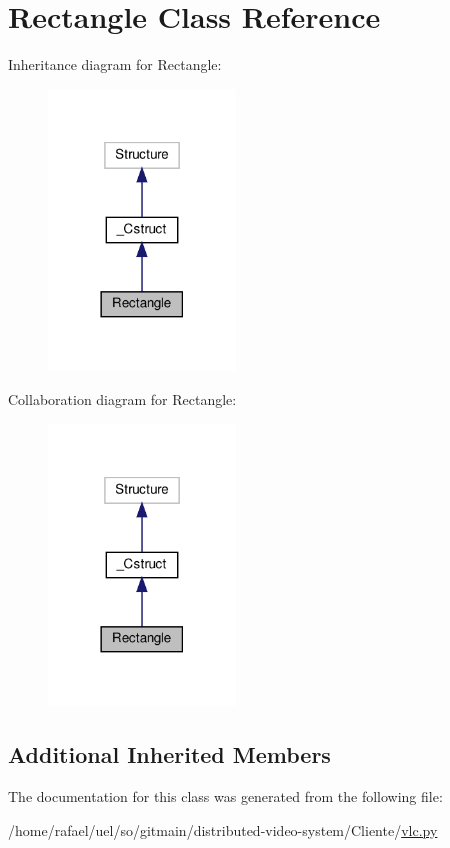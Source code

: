 \hypertarget{classvlc_1_1_rectangle}{}\section{Rectangle Class Reference}
\label{classvlc_1_1_rectangle}


Inheritance diagram for Rectangle\+:
\nopagebreak
\begin{figure}[H]
\begin{center}
\leavevmode
\includegraphics[width=141pt]{classvlc_1_1_rectangle__inherit__graph}
\end{center}
\end{figure}


Collaboration diagram for Rectangle\+:
\nopagebreak
\begin{figure}[H]
\begin{center}
\leavevmode
\includegraphics[width=141pt]{classvlc_1_1_rectangle__coll__graph}
\end{center}
\end{figure}
\subsection*{Additional Inherited Members}


The documentation for this class was generated from the following file\+:\begin{DoxyCompactItemize}
\item 
/home/rafael/uel/so/gitmain/distributed-\/video-\/system/\+Cliente/\hyperlink{vlc_8py}{vlc.\+py}\end{DoxyCompactItemize}
